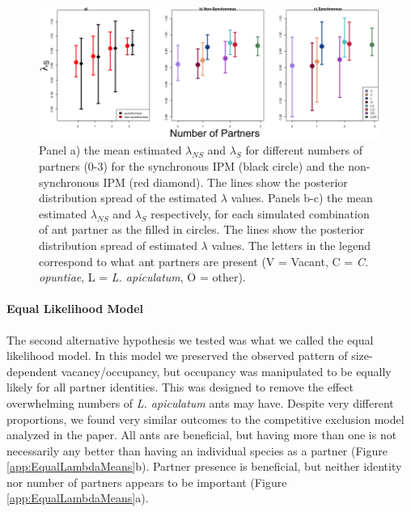 \documentclass[11pt]{article}
\begin{document}
\begin{figure}
\includegraphics[width=0.91\linewidth]{Figures/Lambdas_Freq_lines.png}
	\caption{Panel a) the mean estimated $\lambda_{NS}$ and $\lambda_{S}$ for different numbers of partners (0-3) for the synchronous IPM (black circle) and the non-synchronous IPM (red diamond). The lines show the posterior distribution spread of the estimated $\lambda$ values. Panels b-c) the mean estimated $\lambda_{NS}$ and $\lambda_{S}$ respectively, for each simulated combination of ant partner as the filled in circles. The lines show the posterior distribution spread of estimated $\lambda$ values. The letters in the legend correspond to what ant partners are present (V = Vacant, C = \textit{C. opuntiae}, L = \textit{L. apiculatum}, O = other).}
\label{app:FreqLambdaMeans}
\end{figure}

\paragraph{Equal Likelihood Model}
The second alternative hypothesis we tested was what we called the equal likelihood model.
In this model we preserved the observed pattern of size-dependent vacancy/occupancy, but occupancy was manipulated to be equally likely for all partner identities. 
This was designed to remove the effect overwhelming numbers of \textit{L. apiculatum} ants may have. 
Despite very different proportions, we found very similar outcomes to the competitive exclusion model analyzed in the paper. 
All ants are beneficial, but having more than one is not necessarily any better than having an individual species as a partner (Figure \ref{app:EqualLambdaMeans}b).
Partner presence is beneficial, but neither identity nor number of partners appears to be important (Figure \ref{app:EqualLambdaMeans}a).

\renewcommand{\thefigure}{A\arabic{figure}}
\end{document}

